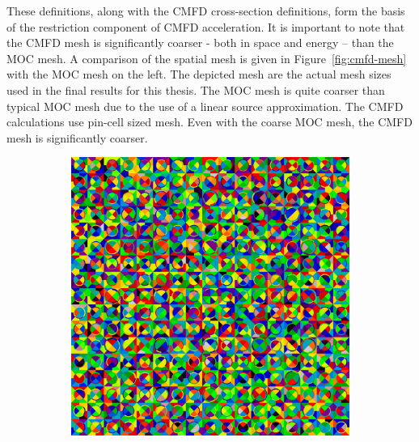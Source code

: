 These definitions, along with the CMFD cross-section definitions, form the basis of the restriction component of CMFD acceleration. It is important to note that the CMFD mesh is significantly coarser - both in space and energy -- than the MOC mesh. A comparison of the spatial mesh is given in Figure~\ref{fig:cmfd-mesh} with the MOC mesh on the left. The depicted mesh are the actual mesh sizes used in the final results for this thesis. The MOC mesh is quite coarser than typical MOC mesh due to the use of a linear source approximation. The CMFD calculations use pin-cell sized mesh. Even with the coarse MOC mesh, the CMFD mesh is significantly coarser.
\begin{figure}[h!]
	\centering
	\begin{subfigure}{0.45\textwidth}
		\centering
		\includegraphics[width=\linewidth]{figures/moc_mesh.PNG}
		\caption{}
		\label{fig:cmfd-mesh-a}
	\end{subfigure}
	\begin{subfigure}{0.45\textwidth}
		\centering

\end{subfigure}
\end{figure}
